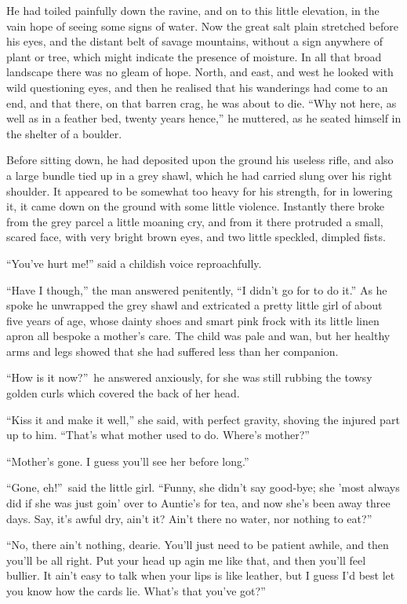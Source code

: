 \documentclass[12pt,english,oneside]{book}
\begin{document}
He had toiled painfully down the ravine, and on to this little elevation,
in the vain hope of seeing some signs of water. Now the great salt
plain stretched before his eyes, and the distant belt of savage mountains,
without a sign anywhere of plant or tree, which might indicate the
presence of moisture. In all that broad landscape there was no gleam
of hope. North, and east, and west he looked with wild questioning
eyes, and then he realised that his wanderings had come to an end,
and that there, on that barren crag, he was about to die. {}``Why
not here, as well as in a feather bed, twenty years hence,'' he muttered,
as he seated himself in the shelter of a boulder.

Before sitting down, he had deposited upon the ground his useless
rifle, and also a large bundle tied up in a grey shawl, which he had
carried slung over his right shoulder. It appeared to be somewhat
too heavy for his strength, for in lowering it, it came down on the
ground with some little violence. Instantly there broke from the grey
parcel a little moaning cry, and from it there protruded a small,
scared face, with very bright brown eyes, and two little speckled,
dimpled fists.

{}``You've hurt me!'' said a childish voice reproachfully.

{}``Have I though,'' the man answered penitently, {}``I didn't
go for to do it.'' As he spoke he unwrapped the grey shawl and extricated
a pretty little girl of about five years of age, whose dainty shoes
and smart pink frock with its little linen apron all bespoke a mother's
care. The child was pale and wan, but her healthy arms and legs showed
that she had suffered less than her companion.

{}``How is it now?''\ he answered anxiously, for she was still
rubbing the towsy golden curls which covered the back of her head.

{}``Kiss it and make it well,'' she said, with perfect gravity,
shoving the injured part up to him. {}``That's what mother used to
do. Where's mother?''

{}``Mother's gone. I guess you'll see her before long.''

{}``Gone, eh!''\ said the little girl. {}``Funny, she didn't say
good-bye; she 'most always did if she was just goin' over to Auntie's
for tea, and now she's been away three days. Say, it's awful dry,
ain't it? Ain't there no water, nor nothing to eat?''

{}``No, there ain't nothing, dearie. You'll just need to be patient
awhile, and then you'll be all right. Put your head up agin me like
that, and then you'll feel bullier. It ain't easy to talk when your
lips is like leather, but I guess I'd best let you know how the cards
lie. What's that you've got?''
\end{document}
